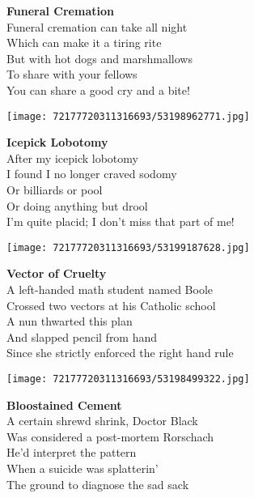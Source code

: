\documentclass[10pt,letterpaper]{article}
\begin{document}
\begin{center}
\textbf{Funeral Cremation}\\
\vskip 0.2in
Funeral cremation can take all night\\
Which can make it a tiring rite\\
But with hot dogs and marshmallows\\
To share with your fellows\\
You can share a good cry and a bite!\\
\end{center}
\pagebreak

\begin{center}\texttt{[image: 72177720311316693/53198962771.jpg]}
\end{center}
\begin{center}
\textbf{Icepick Lobotomy}\\
\vskip 0.2in
After my icepick lobotomy\\
I found I no longer craved sodomy\\
Or billiards or pool\\
Or doing anything but drool\\
I'm quite placid; I don't miss that part of me!\\
\end{center}
\pagebreak

\begin{center}\texttt{[image: 72177720311316693/53199187628.jpg]}
\end{center}
\begin{center}
\textbf{Vector of Cruelty}\\
\vskip 0.2in
A left-handed math student named Boole\\
Crossed two vectors at his Catholic school\\
A nun thwarted this plan\\
And slapped pencil from hand\\
Since she strictly enforced the right hand rule\\
\end{center}
\pagebreak

\begin{center}
\texttt{[image: 72177720311316693/53198499322.jpg]}
\end{center}

\begin{center}
\textbf{Bloostained Cement}\\
\vskip 0.2in
A certain shrewd shrink, Doctor Black\\
Was considered a post-mortem Rorschach\\
He'd interpret the pattern\\
When a suicide was splatterin'\\
The ground to diagnose the sad sack\\
\end{center}
\pagebreak
\end{document}
